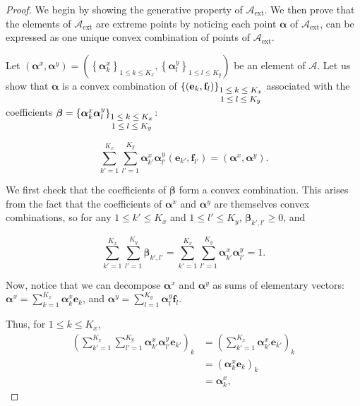 \documentclass{article}
\def\cA{\mathcal{A}}
\def\aalpha{\boldsymbol{\alpha}}
\def\bbeta{\boldsymbol{\beta}}
\def\bbeta{\boldsymbol{\beta}}
\def\ee{\mathbf{e}}
\def\ff{\mathbf{f}}
\begin{document}
\begin{proof}
We begin by showing the generative property of $\cA_{\text{ext}}$. We then prove that the elements of $\cA_{\text{ext}}$ are extreme points by noticing each point $\aalpha$ of $\cA_{\text{ext}}$, can be expressed as one unique convex combination of points of $\cA_{\text{ext}} $.

Let $(\aalpha^x, \aalpha^y) = \left(\left\lbrace \aalpha_{k}^x \right\rbrace_{1 \leq k \leq K_x}, \left\lbrace \aalpha_{l}^y \right\rbrace_{1\leq l \leq K_y} \right)$ be an element of $\cA$. Let us show that $\aalpha$ is a convex combination of  $\left\lbrace \left( \ee_{k}, \ff_{l}\right) \right\rbrace_{\footnotesize \begin{matrix} 1 \leq k \leq K_x \\ 1\leq l \leq K_y \end{matrix}}$ associated with the coefficients $\bbeta = \left\lbrace \aalpha_{k}^x \aalpha_{l}^y\right\rbrace_{\footnotesize \begin{matrix} 1 \leq k \leq K_x \\ 1\leq l \leq K_y \end{matrix}} $:


\begin{equation}
    \sum_{k' = 1}^{K_x} \sum_{l' = 1}^{K_y} \aalpha_{k'}^x\aalpha_{l'}^y (\ee_{k'}, \ff_{l'})  = (\aalpha^x, \aalpha^y).
\end{equation}

We first check that the coefficients of $\bbeta$ form a convex combination. This arises from the fact that the coefficients of $\aalpha^x$ and $\aalpha^y$ are themselves  convex combinations, so for any $1\leq k' \leq K_x$ and $1 \leq l' \leq K_y$, $\bbeta_{k', l'} \geq 0$, and


\begin{equation}
   \sum_{k' = 1}^{K_x} \sum_{l' = 1}^{K_y} \bbeta_{k', l'} = \sum_{k' = 1}^{K_x} \sum_{l' = 1}^{K_y} \aalpha_{k'}^x\aalpha_{l'}^y  = 1 .
\end{equation}



Now, notice that we can decompose $\aalpha^x$ and $\aalpha^y$ as sums of elementary vectors: $\displaystyle  \aalpha^x = \sum_{k = 1}^{K_x} \aalpha^x_{k} \ee_{k}$, and $\displaystyle  \aalpha^y = \sum_{l = 1}^{K_y} \aalpha^y_{l} \ff_{l}$.

Thus, for $1 \leq k \leq K_x$, 
\begin{equation}
    \begin{array}{ll}
        \displaystyle{} \left(\sum_{k' = 1}^{K_x} \sum_{l' = 1}^{K_y} \aalpha_{k'}^x \aalpha_{l'}^y \ee_{k'}\right)_{k} & = \displaystyle{}
          \left(\sum_{k' = 1}^{K_x} \aalpha_{k'}^x \ee_{k'} \right)_{k}\\
         & \displaystyle{} =  (\aalpha_{k}^x \ee_{k})_{k} \\
         &\displaystyle{} = \aalpha^x_{k},
    \end{array}
\end{equation}


\end{proof}
\end{document}
